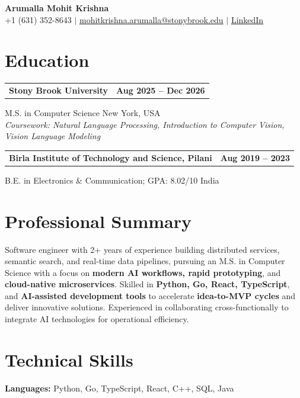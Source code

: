 \documentclass[letterpaper,10pt]{article}
\makeatletter
\newcommand{\entry}[2]{%
  \noindent
  \begin{tabularx}{\linewidth}
    {@{}>{\raggedright\arraybackslash}X@{\hspace{6pt}}r@{}}
    \textbf{#1} & #2
  \end{tabularx}\par
}
\makeatother
\begin{document}
\begin{center}
    {\LARGE\bfseries Arumalla Mohit Krishna}\\[3pt]
    +1 (631) 352-8643 $|$
    \href{mailto:mohitkrishna.arumalla@stonybrook.edu}
    {mohitkrishna.arumalla@stonybrook.edu} $|$
    \href{https://linkedin.com/in/mohit-krishna-arumalla}
    {LinkedIn}
\end{center}
\vspace{-8pt}

\section{Education}

\entry
  {Stony Brook University}
  {\textbf{Aug 2025 -- Dec 2026}}

M.S. in Computer Science \hfill New York, USA\\
\textit{
Coursework: Natural Language Processing,
Introduction to Computer Vision, Vision Language Modeling
}
\vspace{3pt}

\entry
  {Birla Institute of Technology and Science, Pilani}
  {\textbf{Aug 2019 -- 2023}}

B.E. in Electronics \& Communication; GPA: 8.02/10 \hfill India
\section{Professional Summary}

Software engineer with 2+ years of experience building distributed services,
semantic search, and real-time data pipelines, pursuing an M.S. in Computer
Science with a focus on \textbf{modern AI workflows, rapid prototyping}, and
\textbf{cloud-native microservices}. Skilled in \textbf{Python, Go, React,
TypeScript}, and \textbf{AI-assisted development tools} to accelerate
\textbf{idea-to-MVP cycles} and deliver innovative solutions. Experienced in
collaborating cross-functionally to integrate AI technologies for operational
efficiency.

\section{Technical Skills}

\textbf{Languages:}
Python, Go, TypeScript, React, C++, SQL, Java\\
\end{document}
